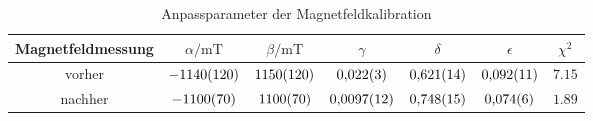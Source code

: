 \begin{table}[h]
   \centering
\caption{Anpassparameter der Magnetfeldkalibration}
\begin{tabular}{c c c c c c c}
\hline Magnetfeldmessung & $\alpha / \unit{\milli\tesla}$ & $\beta / \unit{\milli\tesla}$ & $\gamma$ & $\delta$ & $\epsilon$ & $\chi^2$ \\ 
\hline
vorher & $\num{-1140\pm 120}$ & $\num{1150\pm 120}$ & $\num{0.022\pm 0.003}$ & $\num{0.621\pm 0.014}$ & $\num{0.092\pm 0.011}$ & $\num{7.15}$ \\
nachher & $\num{-1100\pm 70}$ & $\num{1100\pm 70}$ & $\num{0.0097\pm 0.0012}$ & $\num{0.748\pm 0.015}$ & $\num{0.074\pm 0.006}$ & $\num{1.89}$ \\
\hline\end{tabular}
\label{fig:kalibration_tabelle}
\end{table}